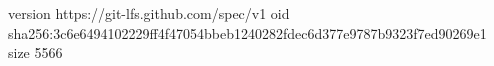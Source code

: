 version https://git-lfs.github.com/spec/v1
oid sha256:3c6e6494102229ff4f47054bbeb1240282fdec6d377e9787b9323f7ed90269e1
size 5566
